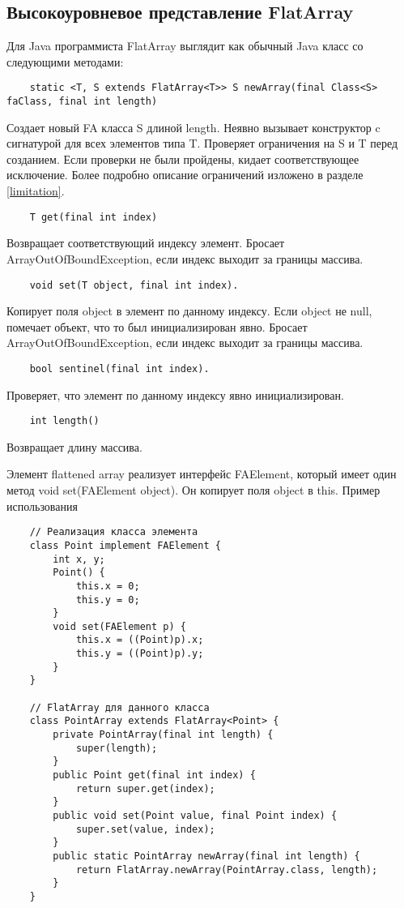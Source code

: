 \subsection{Высокоуровневое представление FlatArray}
Для Java программиста FlatArray выглядит как обычный Java класс со следующими методами:
\begin{lstlisting}
	static <T, S extends FlatArray<T>> S newArray(final Class<S> faClass, final int length)
\end{lstlisting}
Создает новый FA класса S длиной length. Неявно вызывает конструктор c сигнатурой для всех элементов типа T. Проверяет ограничения на S и T перед созданием. Если проверки не были пройдены, кидает соответствующее исключение. Более подробно описание ограничений изложено в разделе \ref{limitation}.
\begin{lstlisting}
	T get(final int index)
\end{lstlisting}
Возвращает соответствующий индексу элемент. Бросает ArrayOutOfBoundException, если индекс выходит за границы массива.
\begin{lstlisting}
	void set(T object, final int index).
\end{lstlisting}
Копирует поля object в элемент по данному индексу. Если object не null, помечает объект, что то был инициализирован явно. Бросает ArrayOutOfBoundException, если индекс выходит за границы массива.
\begin{lstlisting}
	bool sentinel(final int index).
\end{lstlisting}
Проверяет, что элемент по данному индексу явно инициализирован.
\begin{lstlisting}
	int length()
\end{lstlisting}
Возвращает длину массива. 
\par
Элемент flattened array реализует интерфейс FAElement, который имеет один метод void set(FAElement object). Он копирует поля object в this. 
Пример использования
\begin{lstlisting}
	// Реализация класса элемента
	class Point implement FAElement {
		int x, y;
		Point() {
			this.x = 0; 
			this.y = 0; 
		}
		void set(FAElement p) { 
			this.x = ((Point)p).x; 
			this.y = ((Point)p).y; 
		}
	}
	
	// FlatArray для данного класса
	class PointArray extends FlatArray<Point> {
		private PointArray(final int length) { 
			super(length); 
		}
		public Point get(final int index) { 
			return super.get(index); 
		}
		public void set(Point value, final Point index) { 
			super.set(value, index); 
		}
		public static PointArray newArray(final int length) { 
			return FlatArray.newArray(PointArray.class, length); 
		}
	}
\end{lstlisting}

